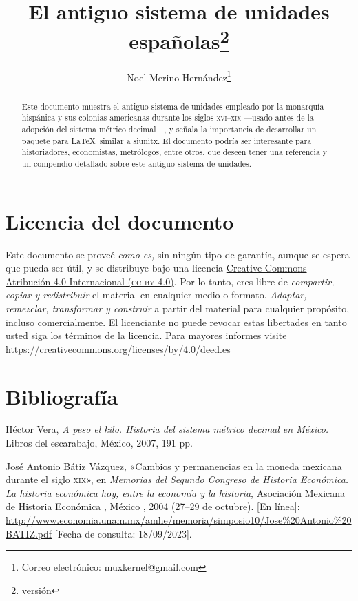 \documentclass[12pt,letterpaper,twoside,final]{article}
\title{El antiguo sistema de unidades españolas\footnote{versión\space\fileversion\space\filedate}}
\author{Noel Merino Hernández\footnote{Correo electrónico: muxkernel@gmail.com}}
\begin{document}
\maketitle
\parindent=5mm
\parskip=0mm
\begin{abstract}
\noindent Este documento muestra el antiguo sistema de unidades empleado por la monarquía hispánica y sus colonias americanas durante los siglos \textsc{xvi--xix} ---usado antes de la adopción del sistema métrico decimal---, y señala la importancia de desarrollar un paquete para \LaTeX\ similar a \textsf{siunitx}. El documento podría ser interesante para historiadores, economistas, metrólogos, entre otros, que deseen tener una referencia y un compendio detallado sobre este antiguo sistema de unidades.
\end{abstract}
\thispagestyle{empty}
\pagestyle{fancy}
\fancyhf{}
\fancyhead[LE,RO]{\thepage}
\renewcommand{\headrulewidth}{0.4pt}
\renewcommand{\listtablename}{Índice de cuadros}
\listoftables
{}
\section{Licencia del documento}
\label{sec:licencia-del-documento}
Este documento se proveé \emph{como es,} sin ningún tipo de garantía, aunque se espera que pueda ser útil, y se distribuye bajo una licencia \href{https://creativecommons.org/licenses/by/4.0/deed.es}{Creative Commons Atribución 4.0 Internacional (\textsc{cc by 4.0})}. Por lo tanto, eres libre de \emph{compartir, copiar y redistribuir} el material en cualquier medio o formato. \emph{Adaptar, remezclar, transformar y construir} a partir del material para cualquier propósito, incluso comercialmente. El licenciante no puede revocar estas libertades en tanto usted siga los términos de la licencia. Para mayores informes visite \url{https://creativecommons.org/licenses/by/4.0/deed.es}
\section{Bibliografía}
\label{sec:bibliografía}
Héctor Vera, \emph{A peso el kilo. Historia del sistema métrico decimal en México.} Libros del escarabajo, México, 2007, 191 pp.

José Antonio Bátiz Vázquez, «Cambios y permanencias en la moneda mexicana durante el siglo \textsc{xix}», en \emph{Memorias del Segundo Congreso de Historia Económica. La historia económica hoy, entre la economía y la historia}, Asociación Mexicana de Historia Económica , México , 2004 (27--29 de octubre). [En línea]: \url{http://www.economia.unam.mx/amhe/memoria/simposio10/Jose\%20Antonio\%20BATIZ.pdf} [Fecha de consulta: 18/09/2023].
\end{document}
